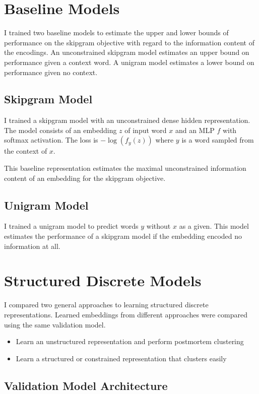 \documentclass[sigconf]{acmart}
\begin{document}
\section{Baseline Models}

I trained two baseline models to estimate the upper and lower bounds of performance on the skipgram objective with regard to the information content of the encodings. An unconstrained skipgram model estimates an upper bound on performance given a context word. A unigram model estimates a lower bound on performance given no context.

\subsection{Skipgram Model}

I trained a skipgram model with an unconstrained dense hidden representation. The model consists of an embedding $z$ of input word $x$ and an MLP $f$ with softmax activation. 
The loss is $-\log( f_y(z))$ where $y$ is a word sampled from the context of $x$.

This baseline representation estimates the maximal unconstrained information content of an embedding for the skipgram objective.

\subsection{Unigram Model}

I trained a unigram model to predict words $y$ without $x$ as a given. This model estimates the performance of a skipgram model if the embedding encoded no information at all.

\section{Structured Discrete Models}

I compared two general approaches to learning structured discrete representations. Learned embeddings from different approaches were compared using the same validation model.

\begin{itemize}
\item Learn an unstructured representation and perform postmortem clustering
\item Learn a structured or constrained representation that clusters easily
\end{itemize}

\subsection{Validation Model Architecture}
\end{document}
